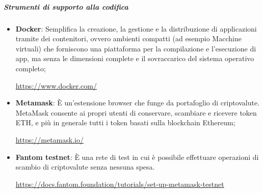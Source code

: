 \subparagraph{Strumenti di supporto alla codifica}
\begin{itemize}
    \item \textbf{Docker}: Semplifica la creazione, la gestione e la distribuzione di applicazioni tramite dei contenitori, ovvero ambienti compatti (ad esempio Macchine virtuali) che forniscono una piattaforma per la compilazione e l'esecuzione di app, ma senza le dimensioni complete e il sovraccarico del sistema operativo completo;
          \begin{center}\url{https://www.docker.com/}\end{center}
    \item \textbf{Metamask}: È un'estensione browser che funge da portafoglio di criptovalute\glo{}. MetaMask consente ai propri utenti di conservare, scambiare e ricevere token\glo{} ETH, e più in generale tutti i token\glo{} basati sulla blockchain\glo{} Ethereum\glo{};
          \begin{center}\url{https://metamask.io/}\end{center}
    \item \textbf{Fantom testnet}: È una rete di test in cui è possibile effettuare operazioni di scambio di criptovalute\glo{} senza nessuna spesa.
          \begin{center}\url{https://docs.fantom.foundation/tutorials/set-up-metamask-testnet}\end{center}
\end{itemize}